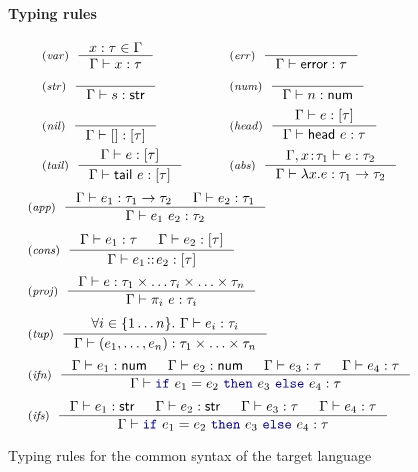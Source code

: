 \begin{figure}[t]
\paragraph{Typing rules}
\begin{equation*}
\begin{array}{ll}
\tyrule{var}
  { x:\tau \in \Gamma }
  { \Gamma \vdash x:\tau }
&
\tyrule{err}
  { ~ }
  { \Gamma \vdash \ident{error}:\tau }
\\[1em]
\tyrule{str}
  { ~ }
  { \Gamma \vdash s:\ident{str} }
&
\tyrule{num}
  { ~ }
  { \Gamma \vdash n:\ident{num} }
\\[1em]
\tyrule{nil}
  { ~ }
  { \Gamma \vdash []:[\tau] }
&
\tyrule{head}
  { \Gamma \vdash e :[\tau] }
  { \Gamma \vdash \ident{head}~e:\tau }
\\[1em]
\tyrule{tail}
  { \Gamma \vdash e :[\tau] }
  { \Gamma \vdash \ident{tail}~e:[\tau] }
\qquad~&
\tyrule{abs}
  { \Gamma, x\!:\!\tau_1 \vdash e : \tau_2 }
  { \Gamma \vdash \lambda x.e : \tau_1 \rightarrow \tau_2 }
\end{array}
\end{equation*}
\begin{equation*}
\begin{array}{l}
\tyrule{app}
  { \Gamma \vdash e_1 : \tau_1 \rightarrow \tau_2  & \Gamma \vdash e_2 : \tau_1 }
  { \Gamma \vdash e_1~e_2 : \tau_2 }
\\[1.25em]
\tyrule{cons}
  { \Gamma \vdash e_1 :\tau & \Gamma \vdash e_2 : [\tau] }
  { \Gamma \vdash e_1\!::\!e_2 : [\tau] }
\\[1.25em]
\tyrule{proj}
  { \Gamma \vdash e : \tau_1 \times \ldots \tau_i \times \ldots \times \tau_n }
  { \Gamma \vdash \pi_i~e:\tau_i }
\\[1.25em]
\tyrule{tup}
  { \forall i\in\{1 \ldots n\}.~ \Gamma \vdash e_i : \tau_i }
  { \Gamma \vdash (e_1, \ldots, e_n) : \tau_1 \times \ldots \times \tau_n }
\\[1.25em]
\tyrule{ifn}
  { \Gamma \vdash e_1 : \ident{num} & \Gamma \vdash e_2 : \ident{num} &
    \Gamma \vdash e_3 : \tau & \Gamma \vdash e_4 : \tau}
  { \Gamma \vdash \kvd{if}~e_1 = e_2~\kvd{then}~e_3~\kvd{else}~e_4 : \tau}
\\[1.25em]
\tyrule{ifs}
  { \Gamma \vdash e_1 : \ident{str} & \Gamma \vdash e_2 : \ident{str} &
    \Gamma \vdash e_3 : \tau & \Gamma \vdash e_4 : \tau}
  { \Gamma \vdash \kvd{if}~e_1 = e_2~\kvd{then}~e_3~\kvd{else}~e_4 : \tau}
\end{array}
\end{equation*}

\caption{Typing rules for the common syntax of the target language}
\label{fig:transl-targetty}
\end{figure}

